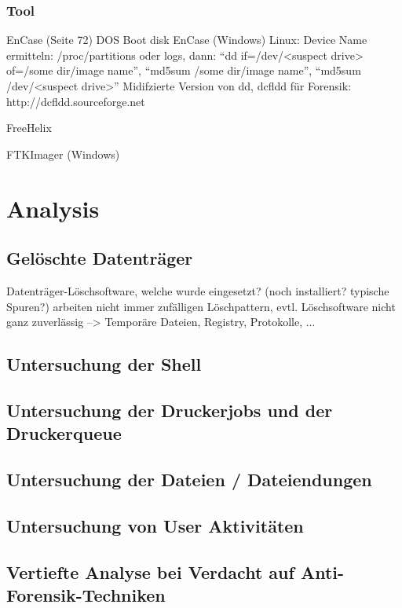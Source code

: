 \subsubsection{Tool}
EnCase (Seite 72) DOS Boot disk
EnCase (Windows)
Linux: Device Name ermitteln: /proc/partitions oder logs, dann: "`dd if=/dev/<suspect drive> of=/some dir/image name"', "`md5sum /some dir/image name"', "`md5sum /dev/<suspect drive>"'
Midifzierte Version von dd, dcfldd für Forensik: http://dcfldd.sourceforge.net

FreeHelix

FTKImager (Windows)


\section{Analysis}

\subsection{Gelöschte Datenträger}
Datenträger-Löschsoftware, welche wurde eingesetzt? (noch installiert? typische Spuren?) arbeiten nicht immer zufälligen Löschpattern, evtl. Löschsoftware nicht ganz zuverlässig --> Temporäre Dateien, Registry, Protokolle, ...

\subsection{Untersuchung der Shell}

\subsection{Untersuchung der Druckerjobs und der Druckerqueue}

\subsection{Untersuchung der Dateien / Dateiendungen}

\subsection{Untersuchung von User Aktivitäten}

\subsection{Vertiefte Analyse bei Verdacht auf Anti-Forensik-Techniken}


